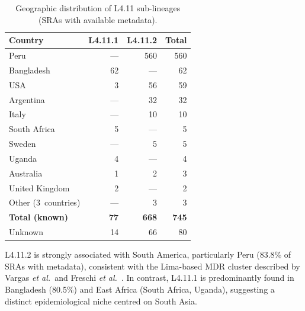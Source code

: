 \documentclass[11pt,a4paper]{article}
\newcommand{\lignee}[1]{\textsf{#1}}
\begin{document}
\begin{table}[htbp]
	\centering
	\caption{Geographic distribution of \lignee{L4.11} sub-lineages
		(SRAs with available metadata).}
	\label{tab:geo}
	\begin{tabular}{lrrr}
		\toprule
		\textbf{Country}       & \textbf{L4.11.1} & \textbf{L4.11.2} & \textbf{Total} \\
		\midrule
		Peru                   & ---              & 560              & 560            \\
		Bangladesh             & 62               & ---              & 62             \\
		USA                    & 3                & 56               & 59             \\
		Argentina              & ---              & 32               & 32             \\
		Italy                  & ---              & 10               & 10             \\
		South Africa           & 5                & ---              & 5              \\
		Sweden                 & ---              & 5                & 5              \\
		Uganda                 & 4                & ---              & 4              \\
		Australia              & 1                & 2                & 3              \\
		United Kingdom         & 2                & ---              & 2              \\
		Other (3~countries)    & ---              & 3                & 3              \\
		\midrule
		\textbf{Total (known)} & \textbf{77}      & \textbf{668}     & \textbf{745}   \\
		Unknown                & 14               & 66               & 80             \\
		\bottomrule
	\end{tabular}
\end{table}

\lignee{L4.11.2} is strongly associated with South America, particularly
Peru (83.8\% of SRAs with metadata), consistent with the Lima-based MDR
cluster described by Vargas \textit{et al.}\ and Freschi \textit{et al.}~\cite{vargas2023,freschi2021}.  In contrast,
\lignee{L4.11.1} is predominantly found in Bangladesh (80.5\%) and
East Africa (South Africa, Uganda), suggesting a distinct epidemiological
niche centred on South Asia.
\end{document}

